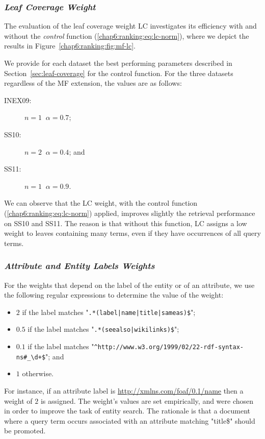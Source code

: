 \subsubsection{\emph{Leaf Coverage Weight}}
\label{sec:lc-weight-effect}

The evaluation of the leaf coverage weight LC investigates its efficiency with and without the \emph{control} function (\ref{chap6:ranking:eq:lc-norm}), where we depict the results in Figure~\ref{chap6:ranking:fig:mf-lc}.

We provide for each dataset the best performing parameters described in Section~\ref{sec:leaf-coverage} for the control function. For the three datasets regardless of the \gls{MF} extension, the values are as follows:
\begin{description}
	\item[INEX09:] $n=1\;\;\alpha=0.7$;
	\item[SS10:] $n=2\;\;\alpha=0.4$; and
	\item[SS11:] $n=1\;\;\alpha=0.9$.
\end{description}
We can observe that the LC weight, with the control function (\ref{chap6:ranking:eq:lc-norm}) applied, improves slightly the retrieval performance on SS10 and SS11. The reason is that without this function, LC assigns a low weight to leaves containing many terms, even if they have occurrences of all query terms.

\subsubsection{\emph{Attribute and Entity Labels Weights}}
\label{sec:ael-weight-effect}

For the weights that depend on the label of the entity or of an attribute, we use the following regular expressions to determine the value of the weight:
\begin{itemize}
	\item $2$ if the label matches "\verb/.*(label|name|title|sameas)$/";
	\item $0.5$ if the label matches "\verb/.*(seealso|wikilinks)$/";
	\item $0.1$ if the label matches "\verb|^http://www.w3.org/1999/02/22-rdf-syntax-ns#_\d+$|"; and
	\item $1$ otherwise.
\end{itemize}
For instance, if an attribute label is \url{http://xmlns.com/foaf/0.1/name} then a weight of $2$ is assigned. The weight's values are set empirically, and were chosen in order to improve the task of entity search. The rationale is that a document where a query term occurs associated with an attribute matching "title\$" should be promoted.

